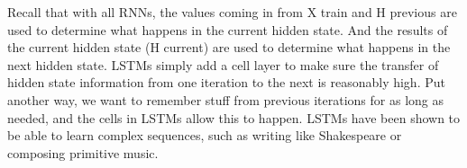 Recall that with all RNNs, the values coming in from X train and H previous are used to determine what happens in the current hidden state. And the results of the current hidden state (H current) are used to determine what happens in the next hidden state. LSTMs simply add a cell layer to make sure the transfer of hidden state information from one iteration to the next is reasonably high. Put another way, we want to remember stuff from previous iterations for as long as needed, and the cells in LSTMs allow this to happen. LSTMs have been shown to be able to learn complex sequences, such as writing like Shakespeare or composing primitive music.